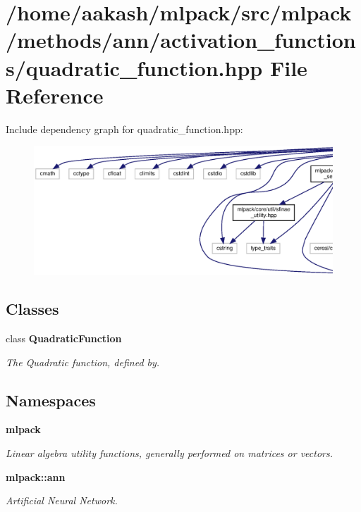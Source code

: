 \section{/home/aakash/mlpack/src/mlpack/methods/ann/activation\+\_\+functions/quadratic\+\_\+function.hpp File Reference}
\label{quadratic__function_8hpp}
Include dependency graph for quadratic\+\_\+function.\+hpp\+:
\nopagebreak
\begin{figure}[H]
\begin{center}
\leavevmode
\includegraphics[width=350pt]{quadratic__function_8hpp__incl}
\end{center}
\end{figure}
\subsection*{Classes}
\begin{DoxyCompactItemize}
\item 
class \textbf{ Quadratic\+Function}
\begin{DoxyCompactList}\small\item\em The Quadratic function, defined by. \end{DoxyCompactList}\end{DoxyCompactItemize}
\subsection*{Namespaces}
\begin{DoxyCompactItemize}
\item 
 \textbf{ mlpack}
\begin{DoxyCompactList}\small\item\em Linear algebra utility functions, generally performed on matrices or vectors. \end{DoxyCompactList}\item 
 \textbf{ mlpack\+::ann}
\begin{DoxyCompactList}\small\item\em Artificial Neural Network. \end{DoxyCompactList}\end{DoxyCompactItemize}


